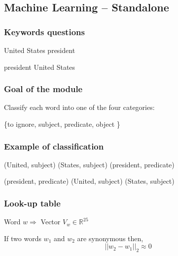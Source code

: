 \subsection{Machine Learning \--- Standalone}

\begin{frame}[fragile]
  \frametitle{Keywords questions}

	
	\begin{center}
  	\alert{United States president}
	\end{center}

	\begin{center}
  	\alert{president United States}
	\end{center}

\end{frame}

\begin{frame}[fragile]
\frametitle{Goal of the module}

Classify each word into one of the four categories: \newline
\begin{center}
 \{to ignore, subject, predicate, object \}
\end{center}

\end{frame}

\begin{frame}[fragile]
	\frametitle{Example of classification}

	\begin{center}
  	\alert{(United, subject) (States, subject) (president, predicate)}
	\end{center}

	\begin{center}
  	\alert{(president, predicate) (United, subject) (States, subject)}
	\end{center}



\end{frame}

\begin{frame}[fragile]
  \frametitle{Look-up table}

	\begin{center}
	Word $w \Rightarrow $ Vector $ V_w \in \mathbb{R}^{25}$
	\end{center}

	\begin{center}
	If two words $w_1$ and $w_2$ are synonymous then, \newline
	$$ || w_2 - w_1 ||_2 \approx 0 $$
	
	\end{center}



\end{frame}



